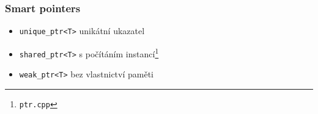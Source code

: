 \begin{frame} \frametitle{Smart pointers}
	\begin{itemize}
		\item{\texttt{unique\_ptr<T>} unikátní ukazatel}
		\item{\texttt{shared\_ptr<T>} s počítáním instancí\footnote{\texttt{ptr.cpp}}}
		\item{\texttt{weak\_ptr<T>} bez vlastnictví paměti}
	\end{itemize}
\end{frame}



